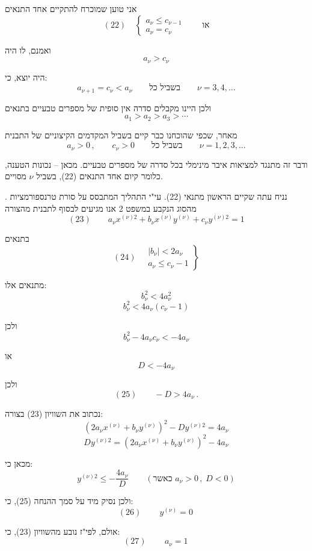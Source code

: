 \noindent אני טוען שמוכרח להתקיים אחד התנאים
\[ (22) \quad \left\{ \begin{array}{l}
a_\nu \le c_{\nu-1} \\
a_\nu = c_\nu
\end{array} \right. \qquad \text{או} \]

\noindent ואמנם, לו היה
\[ a_\nu > c_\nu \]

\noindent היה יוצא, כי:
\[ a_{\nu+1} = c_\nu < a_\nu \qquad \text{בשביל כל} \qquad \nu = 3, 4, \ldots \]

\noindent ולכן היינו מקבלים סדרה אין סופית של מספרים טבעיים בתנאים
\[ a_1 > a_2 > a_3 > \cdots \]

\noindent מאחר, שכפי שהוכחנו כבר קיים בשביל המקדמים הקיצוניים של התבנית
\[ a_\nu > 0 \, , \qquad c_\nu > 0 \qquad \text{בשביל כל} \qquad \nu = 1, 2, 3, \ldots \]

\noindent ודבר זה מתנגד למציאות איבר מינימלי בכל סדרה של מספרים טבעיים.
מכאן -- נכונות הטענה, כלומר קיום אחד התנאים (22), בשביל $\nu$ מסויים.

\medskip
{}. נניח עתה שקיים הראשון מתנאי (22). עי"י התהליך המתבסס על סורת
טרנספורמציות מהסוג הנקבע במשפט 2 אנו מגיעים לבסוף לתבנית מהצורה
\[ (23) \qquad a_\nu x^{(\nu)2} + b_\nu x^{(\nu)} y^{(\nu)} + c_\nu y^{(\nu)2} = 1 \]

\noindent בתנאים
\[ (24) \quad \left. \begin{array}{l}
|b_\nu| < 2a_\nu \\
a_\nu \le c_\nu - 1
\end{array} \right\} \]

\noindent מתנאים אלו:
\[ b_\nu^2 < 4a_\nu^2 \]
\[ b_\nu^2 < 4a_\nu(c_\nu - 1) \]

\noindent ולכן
\[ b_\nu^2 - 4a_\nu c_\nu < -4a_\nu \]

\noindent או
\[ D < -4a_\nu \]

\noindent ולכן
\[ (25) \qquad -D > 4a_\nu \, . \]

\noindent נכתוב את השוויון (23) בצורה:
\[ (2a_\nu x^{(\nu)} + b_\nu y^{(\nu)})^2 - Dy^{(\nu)2} = 4a_\nu \]
\[ Dy^{(\nu)2} = (2a_\nu x^{(\nu)} + b_\nu y^{(\nu)})^2 - 4a_\nu \]

\noindent מכאן כי:
\[ y^{(\nu)2} \le -\frac{4a_\nu}{D} \qquad \left( \text{כאשר } a_\nu > 0 \, , \; D < 0 \right) \]

\noindent ולכן נסיק מיד על סמך ההנחה (25), כי:
\[ (26) \qquad \boxed{\, y^{(\nu)} = 0 \,} \]

\noindent אולם, לפי"ז נובע מהשוויון (23), כי:
\[ (27) \qquad \boxed{\, a_\nu = 1 \,} \]

